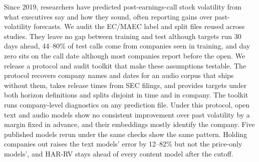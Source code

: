 Since 2019, researchers have predicted post-earnings-call stock volatility from
what executives say and how they sound, often reporting gains over
past-volatility forecasts. We audit the EC/MAEC label and split files reused
across studies. They leave no gap between training and test although targets run
30 days ahead, 44--80\% of test calls come from companies seen in training, and
day zero sits on the call date although most companies report before the open.
We release a protocol and audit toolkit that make these assumptions testable.
The protocol recovers company names and dates for an audio corpus that ships
without them, takes release times from SEC filings, and provides targets under
both horizon definitions and splits disjoint in time and in company. The toolkit runs company-level diagnostics on any prediction file.
Under this protocol, open text and audio models show no consistent
improvement over past volatility by a margin fixed in advance, and
their embeddings mostly identify the company. Five published models rerun under
the same checks show the same pattern. Holding companies out raises the text
models' error by 12--82\% but not the price-only models', and HAR-RV stays
ahead of every content model after the cutoff.
